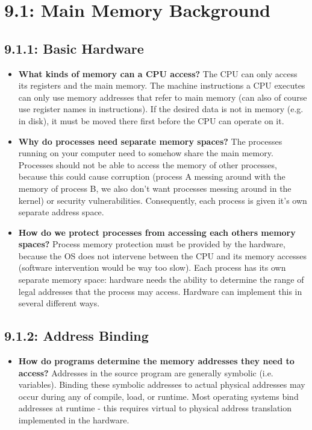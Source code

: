 \documentclass[12pt]{article}
\begin{document}
\section*{9.1: Main Memory Background}

\subsection*{9.1.1: Basic Hardware}

\begin{itemize}
    \item \textbf{What kinds of memory can a CPU access?} The CPU can only access its registers and the main memory. The machine instructions a CPU executes can only use memory addresses that refer to main memory (can also of course use register names in instructions). If the desired data is not in memory (e.g. in disk), it must be moved there first before the CPU can operate on it.
    \item \textbf{Why do processes need separate memory spaces?} The processes running on your computer need to somehow share the main memory. Processes should not be able to access the memory of other processes, because this could cause corruption (process A messing around with the memory of process B, we also don't want processes messing around in the kernel) or security vulnerabilities. Consequently, each process is given it's own separate address space.
    \item \textbf{How do we protect processes from accessing each others memory spaces?} Process memory protection must be provided by the hardware, because the OS does not intervene between the CPU and its memory accesses (software intervention would be way too slow). Each process has its own separate memory space: hardware needs the ability to determine the range of legal addresses that the process may access. Hardware can implement this in several different ways.
\end{itemize}

\subsection*{9.1.2: Address Binding}

\begin{itemize}
    \item \textbf{How do programs determine the memory addresses they need to access?} Addresses in the source program are generally symbolic (i.e. variables). Binding these symbolic addresses to actual physical addresses may occur during any of compile, load, or runtime. Most operating systems bind addresses at runtime - this requires virtual to physical address translation implemented in the hardware.
\end{itemize}
\end{document}

